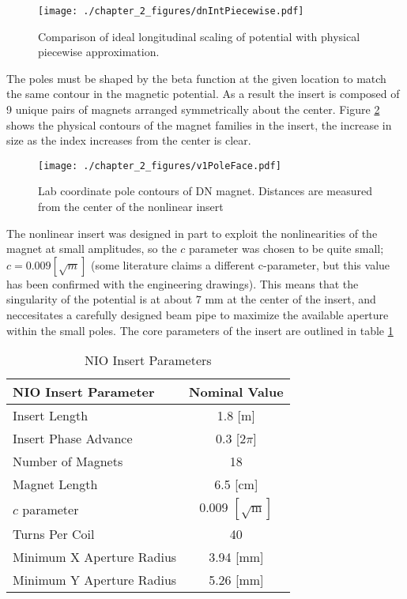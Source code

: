 \begin{figure}
	\centering
	\texttt{[image: ./chapter\_2\_figures/dnIntPiecewise.pdf]}
	\caption{Comparison of ideal longitudinal scaling of potential with physical piecewise approximation.}
	\label{fig:dnLongKick}
\end{figure}


The poles must be shaped by the beta function at the given location to match the same contour in the magnetic potential. As a result the insert is composed of 9 unique pairs of magnets arranged symmetrically about the center. Figure \ref{fig:labPoles} shows the physical contours of the magnet families in the insert, the increase in size as the index increases from the center is clear. 

\begin{figure}
	\centering
	\texttt{[image: ./chapter\_2\_figures/v1PoleFace.pdf]}
	\caption{Lab coordinate pole contours of DN magnet. Distances are measured from the center of the nonlinear insert}
	\label{fig:labPoles}
\end{figure}

The nonlinear insert was designed in part to exploit the nonlinearities of the magnet at small amplitudes, so the $c$ parameter was chosen to be quite small; $c=0.009 [\sqrt{m}]$ (some literature claims a different c-parameter, but this value has been confirmed with the engineering drawings). This means that the singularity of the potential is at about 7 mm at the center of the insert, and neccesitates a carefully designed beam pipe to maximize the available aperture within the small poles. The core parameters of the insert are outlined in table \ref{tab:dnParameters}

\begin{table}
    \centering
    \begin{tabular}{lc}
    \toprule
    \textbf{NIO Insert Parameter} & \textbf{Nominal Value}\\
    \midrule
    Insert Length & 1.8 [m] \\
    Insert Phase Advance & 0.3 [2$\pi$] \\
    Number of Magnets  & 18 \\
    Magnet Length & 6.5 [cm] \\
    $c$ parameter & 0.009 $[\sqrt{\mathrm{m}}]$ \\
    Turns Per Coil & 40 \\
    Minimum X Aperture Radius& 3.94 [mm] \\
    Minimum Y Aperture Radius& 5.26 [mm]\\    
    \bottomrule
    \end{tabular}
    \caption{NIO Insert Parameters}
    \label{tab:dnParameters}
\end{table}

